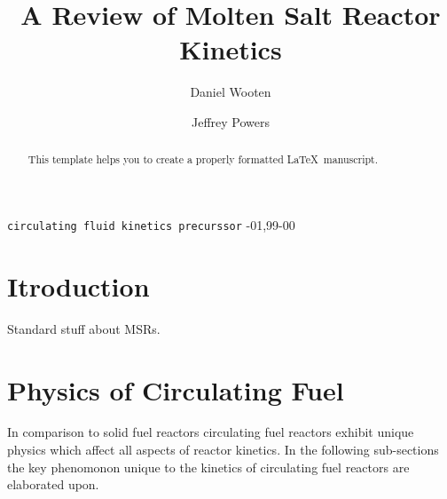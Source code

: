 \documentclass[review]{elsarticle}
\begin{document}
\begin{frontmatter}

\title{A Review of Molten Salt Reactor Kinetics}

\author{Daniel Wooten}
\address{4155 Etcheverry Hall, MC 1730, University of California, Berkeley,
    Berkeley, CA 94720-1730}

\author{Jeffrey Powers}
\address{Oak Ridge}

\begin{abstract}
This template helps you to create a properly formatted \LaTeX\ manuscript.
\end{abstract}

\begin{keyword}
\texttt{circulating fluid kinetics precurssor}
-01\sep  99-00
\end{keyword}

\end{frontmatter}

\linenumbers

\section{Itroduction} \label{introduction}
Standard stuff about MSRs.

\section{Physics of Circulating Fuel} \label{physics}
In comparison to solid fuel reactors circulating fuel reactors exhibit unique
physics which affect all aspects of reactor kinetics. In the following
sub-sections the key phenomonon unique to the kinetics of circulating fuel
reactors are elaborated upon.
\end{document}

